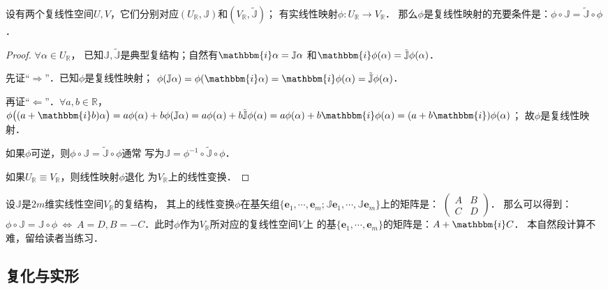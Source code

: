 \begin{proposition}\label{chcx:thm_pJJp}
    设有两个复线性空间$U,V$，它们分别对应$(U_{\mathbb{R}},\mathbb{J})$和$(V_{\mathbb{R}},\tilde{\mathbb{J}})$；
    有实线性映射$\phi:U_{\mathbb{R}}\to V_{\mathbb{R}}$．
    那么$\phi$是复线性映射的充要条件是：$\phi\circ \mathbb{J}=\tilde{\mathbb{J}}\circ \phi$．
\end{proposition}
\begin{proof}
    $\forall \alpha \in U_{\mathbb{R}}$，
    已知$\mathbb{J},\tilde{\mathbb{J}}$是典型复结构；自然有$\mathbbm{i}\alpha = \mathbb{J}\alpha$
    和$\mathbbm{i}\phi(\alpha)= \tilde{\mathbb{J}}\phi(\alpha)$．
    
    先证“$\Rightarrow$”．已知$\phi$是复线性映射；
    $\phi(\mathbb{J}\alpha)=\phi(\mathbbm{i} \alpha)=\mathbbm{i}\phi(\alpha)=\tilde{\mathbb{J}}\phi(\alpha)$．
    
    再证“$\Leftarrow$”．$\forall a,b\in \mathbb{R}$，
    $\phi\bigl((a+\mathbbm{i}b)\alpha \bigr)=a \phi(\alpha) + b \phi(\mathbb{J}\alpha)
    =a \phi(\alpha) + b \tilde{\mathbb{J}}\phi(\alpha)
    =a \phi(\alpha) + b \mathbbm{i}\phi(\alpha) 
    =(a + b \mathbbm{i})\phi(\alpha)  $；
    故$\phi$是复线性映射．
    
    如果$\phi$可逆，则$\phi\circ \mathbb{J}=\tilde{\mathbb{J}}\circ \phi$通常
    写为$ \mathbb{J}= \phi^{-1}\circ\tilde{\mathbb{J}}\circ \phi$．
    
    如果$U_{\mathbb{R}}\equiv V_{\mathbb{R}}$，则线性映射$\phi$退化
    为$V_{\mathbb{R}}$上的线性变换．
\end{proof}

设$\mathbb{J}$是$2m$维实线性空间$V_{\mathbb{R}}$的复结构，
其上的线性变换$\phi$在基矢组$\{\boldsymbol{e}_1,\cdots,\boldsymbol{e}_m;
\mathbb{J}\boldsymbol{e}_1,\cdots,\mathbb{J}\boldsymbol{e}_m\}$上的矩阵是：
$    \left(\begin{smallmatrix}
    A& B \\ C & D
\end{smallmatrix}\right)$．
那么可以得到：  %
$\phi\circ \mathbb{J}=\mathbb{J}\circ \phi \ \Leftrightarrow \ 
A=D, B=-C$．此时$\phi$作为$V_{\mathbb{R}}$所对应的复线性空间$V$上
的基$\{\boldsymbol{e}_1,\cdots,\boldsymbol{e}_m\}$的矩阵是：$A+\mathbbm{i}C$．
本自然段计算不难，留给读者当练习．




\subsection{复化与实形}\label{chcx:sec_cr}

